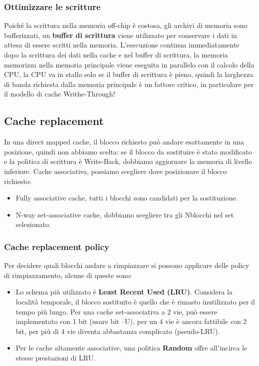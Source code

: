\subsubsection{Ottimizzare le scritture}
Poiché la scrittura nella memoria off-chip è costosa, gli archivi di memoria sono bufferizzati, un \textbf{buffer di scrittura} viene utilizzato per conservare i dati in attesa di essere scritti nella memoria.
L'esecuzione continua immediatamente dopo la scrittura dei dati nella cache e nel buffer di scrittura, la memoria memorizza nella memoria principale viene eseguita in parallelo con il calcolo della CPU, 
la CPU va in stallo solo se il buffer di scrittura è pieno, quindi la larghezza di banda richiesta dalla memoria principale è un fattore critico, in particolare per il modello di cache Writhe-Through!

\subsection{Cache replacement}
In una direct mapped cache, il blocco richiesto può andare esattamente in una posizione, quindi non abbiamo scelta: 
se il blocco da sostituire è stato modificato e la politica di scrittura è Write-Back, dobbiamo aggiornare la memoria di livello inferiore. 
Cache associativa, possiamo scegliere dove posizionare il blocco richiesto: 
\begin{itemize}
	\item Fully associative cache, tutti i blocchi sono candidati per la sostituzione.
	\item N-way set-associative cache, dobbiamo scegliere tra gli Nblocchi nel set selezionato.
\end{itemize}

\subsubsection{Cache replacement policy}
Per decidere quali blocchi andare a rimpiazzare si possono applicare delle policy di rimpiazzamento, alcune di queste sono:
\begin{itemize}
	\item Lo schema più utilizzato è \textbf{Least Recent Used (LRU)}. Considera la località temporale, il blocco sostituito è quello che è rimasto inutilizzato per il tempo più lungo. 
	Per una cache set-associativa a 2 vie, può essere implementato con 1 bit (usare bit --U), per un 4 vie è ancora fattibile con 2 bit, per più di 4 vie diventa abbastanza complicato (pseudo-LRU).
	\item Per le cache altamente associative, una politica \textbf{Random} offre all'incirca le stesse prestazioni di LRU.
\end{itemize}

